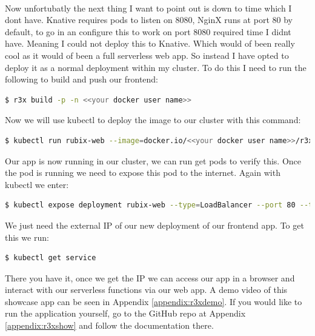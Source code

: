 \\Now unfortubatly the next thing I want to point out is down to time which I dont have. Knative requires pods to listen on 8080, NginX runs at port 80 by default, to go in an configure this to work on port 8080 required time I didnt have. Meaning I could not deploy this to Knative. Which would of been really cool as it would of been a full serverless web app. So instead I have opted to deploy it as a normal deployment within my cluster. To do this I need to run the following to build and push our frontend:
\begin{lstlisting}[language=bash]
$ r3x build -p -n <<your docker user name>>
\end{lstlisting}
Now we will use kubectl to deploy the image to our cluster with this command:
\begin{lstlisting}[language=bash]
$ kubectl run rubix-web --image=docker.io/<<your docker user name>>/r3x-rubix-frontend --port 80
\end{lstlisting}
Our app is now running in our cluster, we can run get pods to verify this. Once the pod is running we need to expose this pod to the internet. Again with kubectl we enter:
\begin{lstlisting}[language=bash]
$ kubectl expose deployment rubix-web --type=LoadBalancer --port 80 --target-port 80
\end{lstlisting}
We just need the external IP of our new deployment of our frontend app. To get this we run:
\begin{lstlisting}[language=bash]
$ kubectl get service
\end{lstlisting}
There you have it, once we get the IP we can access our app in a browser and interact with our serverless functions via our web app. A demo video of this showcase app can be seen in Appendix \ref{appendix:r3xdemo}. If you would like to run the application yourself, go to the GitHub repo at Appendix \ref{appendix:r3xshow} and follow the documentation there.


